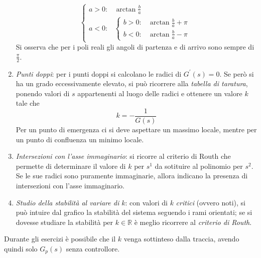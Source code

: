 \begin{enumerate}
\[\begin{cases}
				a > 0 \colon & \arctan{\frac{b}{a}} \\
				a < 0 \colon &
					\begin{cases}
						b > 0\colon & \arctan{\frac{b}{a}} +\pi \\
						b < 0\colon & \arctan{\frac{b}{a}} -\pi
					\end{cases}
			\end{cases}
		\]
		Si osserva che per i poli reali gli angoli di partenza e di arrivo
		sono sempre di \(\frac{\pi}{2}\).
	\item \emph{Punti doppi}:
		per i punti doppi si calcolano le radici di \(G^\prime(s) = 0\).
		Se però si ha un grado eccessivamente elevato, si può ricorrere
		alla \emph{tabella di taratura}, ponendo valori di \(s\) appartenenti
		al luogo delle radici e ottenere un valore \(k\) tale che
		\[
			k = -\frac{1}{G(s)}
		\]
		Per un punto di emergenza ci si deve aspettare un massimo locale,
		mentre per un punto di confluenza un minimo locale.
	\item \emph{Intersezioni con l'asse immaginario}: si ricorre al criterio
		di Routh che permette di determinare il valore di \(k\) per
		\(s^1\) da sotituire al polinomio per \(s^2\). Se le sue
		radici sono puramente immaginarie, allora indicano la presenza di
		intersezioni con l'asse immaginario.
	\item \emph{Studio della stabilità al variare di \(k\)}: con valori
		di \(k\) \emph{critici} (ovvero noti), si può intuire
		dal grafico la stabilità del sistema seguendo i rami orientati;
		se si dovesse studiare la stabilità per \(k \in \mathbb{R}\) è
		meglio ricorrere al \emph{criterio di Routh}.
\end{enumerate}

\begin{nota}
Durante gli esercizi è possibile che il \(k\) venga sottinteso dalla traccia,
avendo quindi solo \(G_p(s)\) senza controllore.
\end{nota}

